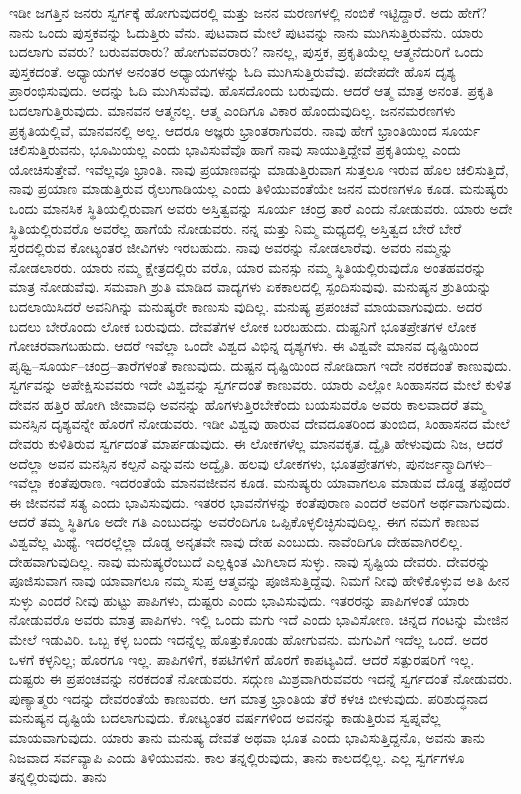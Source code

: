 ಇಡೀ ಜಗತ್ತಿನ ಜನರು ಸ್ವರ್ಗಕ್ಕೆ ಹೋಗುವುದರಲ್ಲಿ ಮತ್ತು ಜನನ ಮರಣಗಳಲ್ಲಿ ನಂಬಿಕೆ ಇಟ್ಟಿದ್ದಾರೆ. ಅದು ಹೇಗೆ? ನಾನು ಒಂದು ಪುಸ್ತಕವನ್ನು ಓದುತ್ತಿರು ವೆನು. ಪುಟವಾದ ಮೇಲೆ ಪುಟವನ್ನು ನಾನು ಮುಗಿಸುತ್ತಿರುವೆನು. ಯಾರು ಬದಲಾಗು ವವರು? ಬರುವವರಾರು? ಹೋಗುವವರಾರು? ನಾನಲ್ಲ, ಪುಸ್ತಕ, ಪ್ರಕೃತಿಯೆಲ್ಲ ಆತ್ಮನೆದುರಿಗೆ ಒಂದು ಪುಸ್ತಕದಂತೆ. ಅಧ್ಯಾಯಗಳ ಅನಂತರ ಅಧ್ಯಾಯಗಳನ್ನು ಓದಿ ಮುಗಿಸುತ್ತಿರುವೆವು. ಪದೇಪದೇ ಹೊಸ ದೃಶ್ಯ ಪ್ರಾರಂಭಿಸುವುದು. ಅದನ್ನು ಓದಿ ಮುಗಿಸುವೆವು. ಹೊಸದೊಂದು ಬರುವುದು. ಆದರೆ ಆತ್ಮ ಮಾತ್ರ ಅನಂತ. ಪ್ರಕೃತಿ ಬದಲಾಗುತ್ತಿರುವುದು. ಮಾನವನ ಆತ್ಮನಲ್ಲ. ಆತ್ಮ ಎಂದಿಗೂ ವಿಕಾರ ಹೊಂದುವುದಿಲ್ಲ. ಜನನಮರಣಗಳು ಪ್ರಕೃತಿಯಲ್ಲಿವೆ, ಮಾನವನಲ್ಲಿ ಅಲ್ಲ. ಆದರೂ ಅಜ್ಞರು ಭ್ರಾಂತರಾಗುವರು. ನಾವು ಹೇಗೆ ಭ್ರಾಂತಿಯಿಂದ ಸೂರ್ಯ ಚಲಿಸುತ್ತಿರುವನು, ಭೂಮಿಯಲ್ಲ ಎಂದು ಭಾವಿಸುವೆವೊ ಹಾಗೆ ನಾವು ಸಾಯುತ್ತಿದ್ದೇವೆ ಪ್ರಕೃತಿಯಲ್ಲ ಎಂದು ಯೋಚಿಸುತ್ತೇವೆ. ಇವೆಲ್ಲವೂ ಭ್ರಾಂತಿ. ನಾವು ಪ್ರಯಾಣವನ್ನು ಮಾಡುತ್ತಿರುವಾಗ ಸುತ್ತಲೂ ಇರುವ ಹೊಲ ಚಲಿಸುತ್ತಿದೆ, ನಾವು ಪ್ರಯಾಣ ಮಾಡುತ್ತಿರುವ ರೈಲುಗಾಡಿಯಲ್ಲ ಎಂದು ತಿಳಿಯುವಂತೆಯೇ ಜನನ ಮರಣಗಳೂ ಕೂಡ. ಮನುಷ್ಯರು ಒಂದು ಮಾನಸಿಕ ಸ್ಥಿತಿಯಲ್ಲಿರುವಾಗ ಅವರು ಅಸ್ತಿತ್ವವನ್ನು ಸೂರ್ಯ ಚಂದ್ರ ತಾರೆ ಎಂದು ನೋಡುವರು. ಯಾರು ಅದೇ ಸ್ಥಿತಿಯಲ್ಲಿರುವರೊ ಅವರೆಲ್ಲ ಹಾಗೆಯೆ ನೋಡುವರು. ನನ್ನ ಮತ್ತು ನಿಮ್ಮ ಮಧ್ಯದಲ್ಲಿ ಅಸ್ತಿತ್ವದ ಬೇರೆ ಬೇರೆ ಸ್ತರದಲ್ಲಿರುವ ಕೋಟ್ಯಂತರ ಜೀವಿಗಳು ಇರಬಹುದು. ನಾವು ಅವರನ್ನು ನೋಡಲಾರೆವು. ಅವರು ನಮ್ಮನ್ನು ನೋಡಲಾರರು. ಯಾರು ನಮ್ಮ ಕ್ಷೇತ್ರದಲ್ಲಿರು ವರೊ, ಯಾರ ಮನಸ್ಸು ನಮ್ಮ ಸ್ಥಿತಿಯಲ್ಲಿರುವುದೊ ಅಂತಹವರನ್ನು ಮಾತ್ರ ನೋಡುವೆವು. ಸಮವಾಗಿ ಶ್ರುತಿ ಮಾಡಿದ ವಾದ್ಯಗಳು ಏಕಕಾಲದಲ್ಲಿ ಸ್ಪಂದಿಸುವುವು. ಮನುಷ್ಯನ ಶ್ರುತಿಯನ್ನು ಬದಲಾಯಿಸಿದರೆ ಅವನಿಗಿನ್ನು ಮನುಷ್ಯರೇ ಕಾಣುಸು ವುದಿಲ್ಲ. ಮನುಷ್ಯ ಪ್ರಪಂಚವೆ ಮಾಯವಾಗುವುದು. ಅದರ ಬದಲು ಬೇರೊಂದು ಲೋಕ ಬರುವುದು. ದೇವತೆಗಳ ಲೋಕ ಬರಬಹುದು. ದುಷ್ಟನಿಗೆ ಭೂತಪ್ರೇತಗಳ ಲೋಕ ಗೋಚರವಾಗಬಹುದು. ಆದರೆ ಇವೆಲ್ಲಾ ಒಂದೇ ವಿಶ್ವದ ವಿಭಿನ್ನ ದೃಶ್ಯಗಳು. ಈ ವಿಶ್ವವೇ ಮಾನವ ದೃಷ್ಟಿಯಿಂದ ಪೃಥ್ವಿ–ಸೂರ್ಯ–ಚಂದ್ರ–ತಾರೆಗಳಂತೆ ಕಾಣುವುದು. ದುಷ್ಟನ ದೃಷ್ಟಿಯಿಂದ ನೋಡಿದಾಗ ಇದೇ ನರಕದಂತೆ ಕಾಣುವುದು. ಸ್ವರ್ಗವನ್ನು ಅಪೇಕ್ಷಿಸುವವರು ಇದೇ ವಿಶ್ವವನ್ನು ಸ್ವರ್ಗದಂತೆ ಕಾಣುವರು. ಯಾರು ಎಲ್ಲೋ ಸಿಂಹಾಸನದ ಮೇಲೆ ಕುಳಿತ ದೇವನ ಹತ್ತಿರ ಹೋಗಿ ಜೀವಾವಧಿ ಅವನನ್ನು ಹೊಗಳುತ್ತಿರಬೇಕೆಂದು ಬಯಸುವರೊ ಅವರು ಕಾಲವಾದರೆ ತಮ್ಮ ಮನಸ್ಸಿನ ದೃಶ್ಯವನ್ನೇ ಹೊರಗೆ ನೋಡುವರು. ಇಡೀ ವಿಶ್ವವು ಹಾರುವ ದೇವದೂತರಿಂದ ತುಂಬಿದ, ಸಿಂಹಾಸನದ ಮೇಲೆ ದೇವರು ಕುಳಿತಿರುವ ಸ್ವರ್ಗದಂತೆ ಮಾರ್ಪಡುವುದು. ಈ ಲೋಕಗಳೆಲ್ಲ ಮಾನವಕೃತ. ದ್ವೈತಿ ಹೇಳುವುದು ನಿಜ, ಆದರೆ ಅದೆಲ್ಲಾ ಅವನ ಮನಸ್ಸಿನ ಕಲ್ಪನೆ ಎನ್ನುವನು ಅದ್ವೈತಿ. ಹಲವು ಲೋಕಗಳು, ಭೂತಪ್ರೇತಗಳು, ಪುನರ್ಜನ್ಮಾದಿಗಳು–ಇವೆಲ್ಲಾ ಕಂತೆಪುರಾಣ. ಇದರಂತೆಯೆ ಮಾನವಜೀವನ ಕೂಡ. ಮನುಷ್ಯರು ಯಾವಾಗಲೂ ಮಾಡುವ ದೊಡ್ಡ ತಪ್ಪೆಂದರೆ ಈ ಜೀವನವೆ ಸತ್ಯ ಎಂದು ಭಾವಿಸುವುದು. ಇತರರ ಭಾವನೆಗಳನ್ನು ಕಂತೆಪುರಾಣ ಎಂದರೆ ಅವರಿಗೆ ಅರ್ಥವಾಗುವುದು. ಆದರೆ ತಮ್ಮ ಸ್ಥಿತಿಗೂ ಅದೇ ಗತಿ ಎಂಬುದನ್ನು ಅವರೆಂದಿಗೂ ಒಪ್ಪಿಕೊಳ್ಳಲಿಚ್ಛಿಸುವುದಿಲ್ಲ. ಈಗ ನಮಗೆ ಕಾಣುವ ವಿಶ್ವವೆಲ್ಲ ಮಿಥ್ಯೆ. ಇದರಲ್ಲೆಲ್ಲಾ ದೊಡ್ಡ ಅನೃತವೇ ನಾವು ದೇಹ ಎಂಬುದು. ನಾವೆಂದಿಗೂ ದೇಹವಾಗಿರಲಿಲ್ಲ. ದೇಹವಾಗುವುದಿಲ್ಲ. ನಾವು ಮನುಷ್ಯರೆಂಬುದೆ ಎಲ್ಲಕ್ಕಿಂತ ಮಿಗಿಲಾದ ಸುಳ್ಳು. ನಾವು ಸೃಷ್ಟಿಯ ದೇವರು. ದೇವರನ್ನು ಪೂಜಿಸುವಾಗ ನಾವು ಯಾವಾಗಲೂ ನಮ್ಮ ಸುಪ್ತ ಆತ್ಮವನ್ನು ಪೂಜಿಸುತ್ತಿದ್ದೆವು. ನಿಮಗೆ ನೀವು ಹೇಳಿಕೊಳ್ಳುವ ಅತಿ ಹೀನ ಸುಳ್ಳು ಎಂದರೆ ನೀವು ಹುಟ್ಟು ಪಾಪಿಗಳು, ದುಷ್ಟರು ಎಂದು ಭಾವಿಸುವುದು. ಇತರರನ್ನು ಪಾಪಿಗಳಂತೆ ಯಾರು ನೋಡುವರೊ ಅವರು ಮಾತ್ರ ಪಾಪಿಗಳು. ಇಲ್ಲಿ ಒಂದು ಮಗು ಇದೆ ಎಂದು ಭಾವಿಸೋಣ. ಚಿನ್ನದ ಗಂಟನ್ನು ಮೇಜಿನ ಮೇಲೆ ಇಡುವಿರಿ. ಒಬ್ಬ ಕಳ್ಳ ಬಂದು ಇದನ್ನೆಲ್ಲ ಹೊತ್ತುಕೊಂಡು ಹೋಗುವನು. ಮಗುವಿಗೆ ಇದೆಲ್ಲ ಒಂದೆ. ಅದರ ಒಳಗೆ ಕಳ್ಳನಿಲ್ಲ; ಹೊರಗೂ ಇಲ್ಲ. ಪಾಪಿಗಳಿಗೆ, ಕಪಟಿಗಳಿಗೆ ಹೊರಗೆ ಕಾಪಟ್ಯವಿದೆ. ಆದರೆ ಸತ್ಪುರಷರಿಗೆ ಇಲ್ಲ. ದುಷ್ಟರು ಈ ಪ್ರಪಂಚವನ್ನು ನರಕದಂತೆ ನೋಡುವರು. ಸದ್ಗುಣ ಮಿಶ್ರವಾಗಿರುವವರು ಇದನ್ನೆ ಸ್ವರ್ಗದಂತೆ ನೋಡುವರು. ಪುಣ್ಯಾತ್ಮರು ಇದನ್ನು ದೇವರಂತೆಯೆ ಕಾಣುವರು. ಆಗ ಮಾತ್ರ ಭ್ರಾಂತಿಯ ತೆರೆ ಕಳಚಿ ಬೀಳುವುದು. ಪರಿಶುದ್ಧನಾದ ಮನುಷ್ಯನ ದೃಷ್ಟಿಯೆ ಬದಲಾಗುವುದು. ಕೋಟ್ಯಂತರ ವರ್ಷಗಳಿಂದ ಅವನನ್ನು ಕಾಡುತ್ತಿರುವ ಸ್ವಪ್ನವೆಲ್ಲ ಮಾಯವಾಗುವುದು. ಯಾರು ತಾನು ಮನುಷ್ಯ ದೇವತೆ ಅಥವಾ ಭೂತ ಎಂದು ಭಾವಿಸುತ್ತಿದ್ದನೊ, ಅವನು ತಾನು ನಿಜವಾದ ಸರ್ವವ್ಯಾಪಿ ಎಂದು ತಿಳಿಯುವನು. ಕಾಲ ತನ್ನಲ್ಲಿರುವುದು, ತಾನು ಕಾಲದಲ್ಲಿಲ್ಲ. ಎಲ್ಲ ಸ್ವರ್ಗಗಳೂ ತನ್ನಲ್ಲಿರುವುದು. ತಾನು 